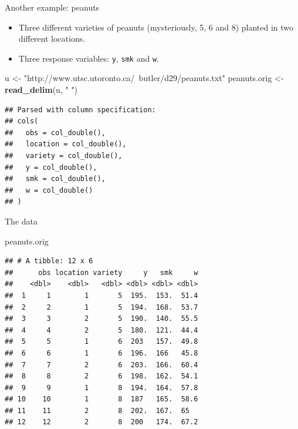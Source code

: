 \documentclass[
  ignorenonframetext,
]{beamer}
\newenvironment{Shaded}{\begin{snugshade}}{\end{snugshade}}
\newcommand{\KeywordTok}[1]{\textcolor[rgb]{0.13,0.29,0.53}{\textbf{#1}}}
\newcommand{\NormalTok}[1]{#1}
\newcommand{\StringTok}[1]{\textcolor[rgb]{0.31,0.60,0.02}{#1}}
\begin{document}
\begin{frame}[fragile]{Another example: peanuts}
\protect\hypertarget{another-example-peanuts}{}

\begin{itemize}
\item
  Three different varieties of peanuts (mysteriously, 5, 6 and 8)
  planted in two different locations.
\item
  Three response variables: \texttt{y}, \texttt{smk} and \texttt{w}.
\end{itemize}

\begin{Shaded}
\begin{Highlighting}[]
\NormalTok{u <-}\StringTok{ "http://www.utsc.utoronto.ca/~butler/d29/peanuts.txt"}
\NormalTok{peanuts.orig <-}\StringTok{ }\KeywordTok{read_delim}\NormalTok{(u, }\StringTok{" "}\NormalTok{)}
\end{Highlighting}
\end{Shaded}

\begin{verbatim}
## Parsed with column specification:
## cols(
##   obs = col_double(),
##   location = col_double(),
##   variety = col_double(),
##   y = col_double(),
##   smk = col_double(),
##   w = col_double()
## )
\end{verbatim}

\end{frame}

\begin{frame}[fragile]{The data}
\protect\hypertarget{the-data-10}{}

\small

\begin{Shaded}
\begin{Highlighting}[]
\NormalTok{peanuts.orig}
\end{Highlighting}
\end{Shaded}

\begin{verbatim}
## # A tibble: 12 x 6
##      obs location variety     y   smk     w
##    <dbl>    <dbl>   <dbl> <dbl> <dbl> <dbl>
##  1     1        1       5  195.  153.  51.4
##  2     2        1       5  194.  168.  53.7
##  3     3        2       5  190.  140.  55.5
##  4     4        2       5  180.  121.  44.4
##  5     5        1       6  203   157.  49.8
##  6     6        1       6  196.  166   45.8
##  7     7        2       6  203.  166.  60.4
##  8     8        2       6  198.  162.  54.1
##  9     9        1       8  194.  164.  57.8
## 10    10        1       8  187   165.  58.6
## 11    11        2       8  202.  167.  65  
## 12    12        2       8  200   174.  67.2
\end{verbatim}

\normalsize

\end{frame}
\end{document}
